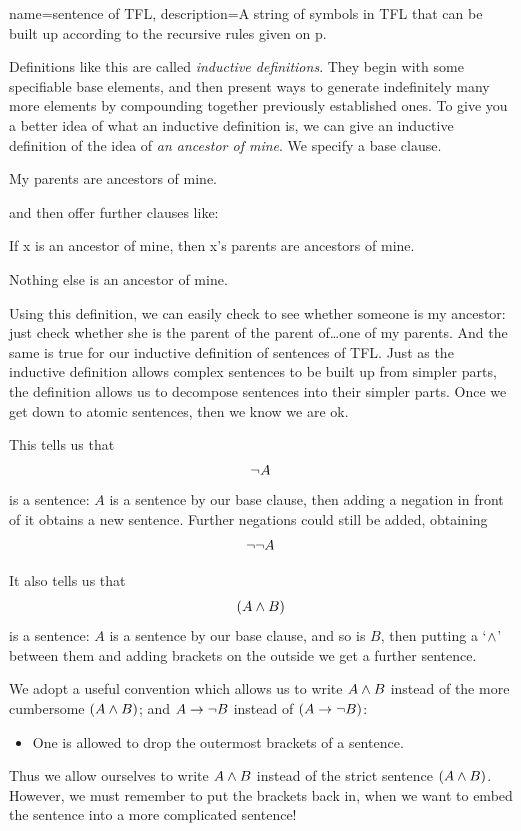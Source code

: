 {
	name=sentence of TFL,
	description={A string of symbols in TFL that can be built up according to the recursive rules given on p.~\pageref{TFLsentences}}
}

Definitions like this are called \emph{inductive definitions}. They begin with some specifiable base elements, and then present ways to generate indefinitely many more elements by compounding together previously established ones. To give you a better idea of what an inductive definition is, we can give an inductive definition of the idea of \emph{an ancestor of mine}. We specify a base clause.
\begin{ebullet}
	\item My parents are ancestors of mine.
\end{ebullet}
and then offer further clauses like:
\begin{ebullet}
	\item If x is an ancestor of mine, then x's parents are ancestors of mine.
	\item Nothing else is an ancestor of mine.
\end{ebullet}
Using this definition, we can easily check to see whether someone is my ancestor: just check whether she is the parent of the parent of\ldots one of my parents. And the same is true for our inductive definition of sentences of TFL. Just as the inductive definition allows complex sentences to be built up from simpler parts, the definition allows us to decompose sentences into their simpler parts. Once we get down to atomic sentences, then we know we are ok.

This tells us that $$\neg A$$ is a sentence: $A$ is a sentence by our base clause, then adding a negation in front of it obtains a new sentence. Further negations could still be added, obtaining $$\neg\neg A$$

It also tells us that $$(A\mathbin{\wedge} B)$$ is a sentence: $A$ is a sentence by our base clause, and so is $B$, then putting a `$\mathbin{\wedge}$' between them and adding brackets on the outside we get a further sentence. 

We adopt a useful convention which allows us to write $A\mathbin{\wedge} B$ instead of the more cumbersome $(A\mathbin{\wedge} B)$; and $A\rightarrow \neg B$ instead of $(A\rightarrow \neg B)$:
\begin{itemize}
	\item One is allowed to drop the outermost brackets of a sentence. 
\end{itemize}

Thus we allow ourselves to write $A\mathbin{\wedge} B$ instead of the strict sentence $(A\mathbin{\wedge} B)$. However, we must remember to put the brackets back in, when we want to embed the sentence into a more complicated sentence!

